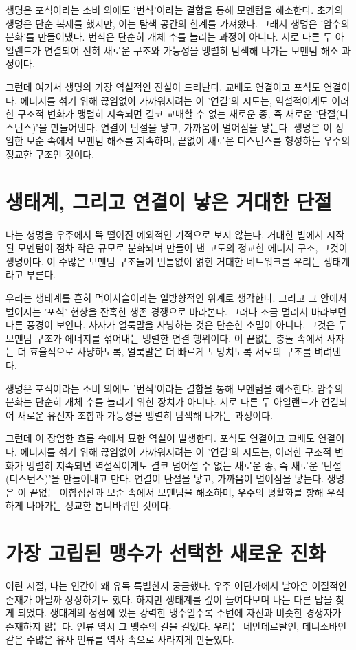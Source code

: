 \documentclass[12pt,a4paper]{article}
\begin{document}
생명은 포식이라는 소비 외에도 '번식'이라는 결합을 통해 모멘텀을 해소한다. 초기의 생명은 단순 복제를 했지만, 이는 탐색 공간의 한계를 가져왔다. 그래서 생명은 '암수의 분화'를 만들어냈다. 번식은 단순히 개체 수를 늘리는 과정이 아니다. 서로 다른 두 아일랜드가 연결되어 전혀 새로운 구조와 가능성을 맹렬히 탐색해 나가는 모멘텀 해소 과정이다.

그런데 여기서 생명의 가장 역설적인 진실이 드러난다. 교배도 연결이고 포식도 연결이다. 에너지를 섞기 위해 끊임없이 가까워지려는 이 '연결'의 시도는, 역설적이게도 이러한 구조적 변화가 맹렬히 지속되면 결코 교배할 수 없는 새로운 종, 즉 새로운 '단절(디스턴스)'을 만들어낸다. 연결이 단절을 낳고, 가까움이 멀어짐을 낳는다. 생명은 이 장엄한 모순 속에서 모멘텀 해소를 지속하며, 끝없이 새로운 디스턴스를 형성하는 우주의 정교한 구조인 것이다.

\section{생태계, 그리고 연결이 낳은 거대한 단절}
나는 생명을 우주에서 뚝 떨어진 예외적인 기적으로 보지 않는다. 거대한 별에서 시작된 모멘텀이 점차 작은 규모로 분화되며 만들어 낸 고도의 정교한 에너지 구조, 그것이 생명이다. 이 수많은 모멘텀 구조들이 빈틈없이 얽힌 거대한 네트워크를 우리는 생태계라고 부른다.

우리는 생태계를 흔히 먹이사슬이라는 일방향적인 위계로 생각한다. 그리고 그 안에서 벌어지는 '포식' 현상을 잔혹한 생존 경쟁으로 바라본다. 그러나 조금 멀리서 바라보면 다른 풍경이 보인다. 사자가 얼룩말을 사냥하는 것은 단순한 소멸이 아니다. 그것은 두 모멘텀 구조가 에너지를 섞어내는 맹렬한 연결 행위이다. 이 끝없는 충돌 속에서 사자는 더 효율적으로 사냥하도록, 얼룩말은 더 빠르게 도망치도록 서로의 구조를 벼려낸다.

생명은 포식이라는 소비 외에도 '번식'이라는 결합을 통해 모멘텀을 해소한다. 암수의 분화는 단순히 개체 수를 늘리기 위한 장치가 아니다. 서로 다른 두 아일랜드가 연결되어 새로운 유전자 조합과 가능성을 맹렬히 탐색해 나가는 과정이다.

그런데 이 장엄한 흐름 속에서 묘한 역설이 발생한다. 포식도 연결이고 교배도 연결이다. 에너지를 섞기 위해 끊임없이 가까워지려는 이 '연결'의 시도는, 이러한 구조적 변화가 맹렬히 지속되면 역설적이게도 결코 넘어설 수 없는 새로운 종, 즉 새로운 '단절(디스턴스)'을 만들어내고 만다. 연결이 단절을 낳고, 가까움이 멀어짐을 낳는다. 생명은 이 끝없는 이합집산과 모순 속에서 모멘텀을 해소하며, 우주의 평활화를 향해 우직하게 나아가는 정교한 톱니바퀴인 것이다.

\section{가장 고립된 맹수가 선택한 새로운 진화}
어린 시절, 나는 인간이 왜 유독 특별한지 궁금했다. 우주 어딘가에서 날아온 이질적인 존재가 아닐까 상상하기도 했다. 하지만 생태계를 깊이 들여다보며 나는 다른 답을 찾게 되었다. 생태계의 정점에 있는 강력한 맹수일수록 주변에 자신과 비슷한 경쟁자가 존재하지 않는다. 인류 역시 그 맹수의 길을 걸었다. 우리는 네안데르탈인, 데니소바인 같은 수많은 유사 인류를 역사 속으로 사라지게 만들었다.
\end{document}
